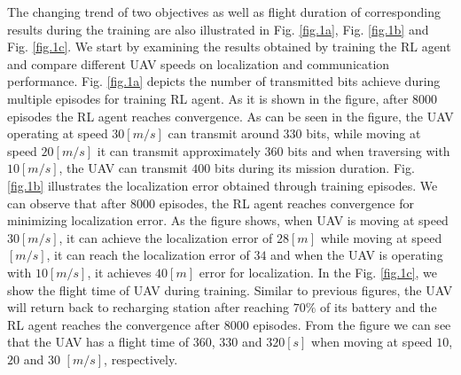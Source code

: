 \documentclass[journal,twocolumn]{IEEEtran}
\begin{document}
{The changing trend of two objectives as well as flight duration of corresponding results during the training are also illustrated in Fig. \ref{fig.1a}, Fig. \ref{fig.1b} and Fig. \ref{fig.1c}. We start by examining the results obtained by training the RL agent and compare different UAV speeds on localization and communication performance. Fig. \ref{fig.1a} depicts the number of transmitted bits achieve during multiple episodes for training RL agent. As it is shown in the figure, after $8000$ episodes the RL agent reaches convergence. As can be seen in the figure, the UAV operating at speed $30 [m/s]$ can transmit around $330$ bits, while moving at speed $20 [m/s]$ it can transmit approximately $360$ bits and when traversing with $10 [m/s]$, the UAV can transmit $400$ bits during its mission duration. Fig. \ref{fig.1b} illustrates the localization error obtained through training episodes. We can observe that after $8000$ episodes, the RL agent reaches convergence for minimizing localization error. As the figure shows, when UAV is moving at speed $30 [m/s]$, it can achieve the localization error of $28 [m]$ while moving at speed $ [m/s]$, it can reach the localization error of $34$ and when the UAV is operating with $10 [m/s]$, it achieves $40 [m]$ error for localization. In the Fig. \ref{fig.1c}, we show the flight time of UAV during training. Similar to previous figures, the UAV will return back to recharging station after reaching $70\%$ of its battery and the RL agent reaches the convergence after $8000$ episodes. From the figure we can see that the UAV has a flight time of $360$, $330$ and $320 [s]$ when moving at speed $10$,$20$ and $30$ $[m/s]$, respectively.





}
\end{document}
